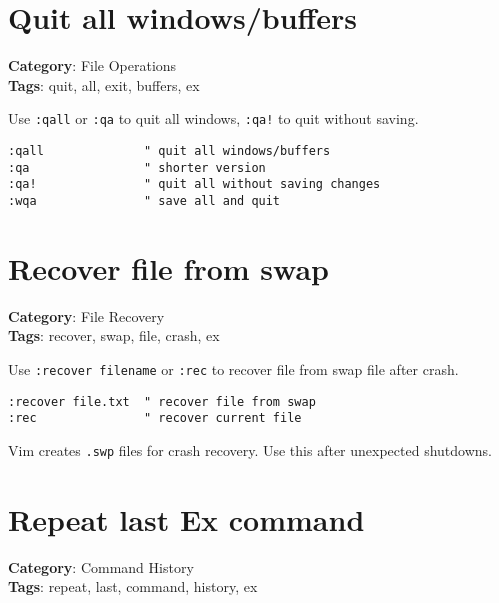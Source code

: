{{{{{{\section{Quit all windows/buffers}

\textbf{Category}: File Operations\\ \textbf{Tags}: quit, all, exit, buffers, ex
\vspace{0.5cm}

Use {\footnotesize \Verb§:qall§} or {\footnotesize \Verb§:qa§} to quit all windows, {\footnotesize \Verb§:qa!§} to quit without saving.

\begin{Exa*}{}
\begin{Verbatim}[fontsize=\footnotesize, breaklines, breakanywhere]
:qall              " quit all windows/buffers
:qa                " shorter version
:qa!               " quit all without saving changes
:wqa               " save all and quit
\end{Verbatim}
\end{Exa*}

\section{Recover file from swap}

\textbf{Category}: File Recovery\\ \textbf{Tags}: recover, swap, file, crash, ex
\vspace{0.5cm}

Use {\footnotesize \Verb§:recover filename§} or {\footnotesize \Verb§:rec§} to recover file from swap file after crash.

\begin{Exa*}{}
\begin{Verbatim}[fontsize=\footnotesize, breaklines, breakanywhere]
:recover file.txt  " recover file from swap
:rec               " recover current file
\end{Verbatim}
\end{Exa*}

Vim creates {\footnotesize \Verb§.swp§} files for crash recovery. Use this after unexpected shutdowns.

\section{Repeat last Ex command}

\textbf{Category}: Command History\\ \textbf{Tags}: repeat, last, command, history, ex
\vspace{0.5cm}

}}}}}}
